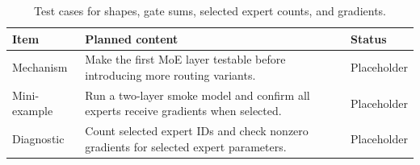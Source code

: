 \begin{table}[H]
\centering
\caption{Test cases for shapes, gate sums, selected expert counts, and gradients.}
\label{tab:ch03-shape-and-gradient-checks}
\begin{tabularx}{\textwidth}{p{}X p{}}
\toprule
Item & Planned content & Status \\
\midrule
Mechanism & Make the first MoE layer testable before introducing more routing variants. & Placeholder \\
Mini-example & Run a two-layer smoke model and confirm all experts receive gradients when selected. & Placeholder \\
Diagnostic & Count selected expert IDs and check nonzero gradients for selected expert parameters. & Placeholder \\
\bottomrule
\end{tabularx}
\end{table}
